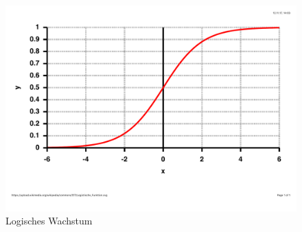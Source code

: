 \begin{enumerate}
	\begin{figure}[!h]
		\centering
		\includegraphics[scale=0.4]{img/grafik_markt.pdf} 
		\caption{Logisches Wachstum} \label{fig:abb24}
	\end{figure}
	

\end{enumerate}
